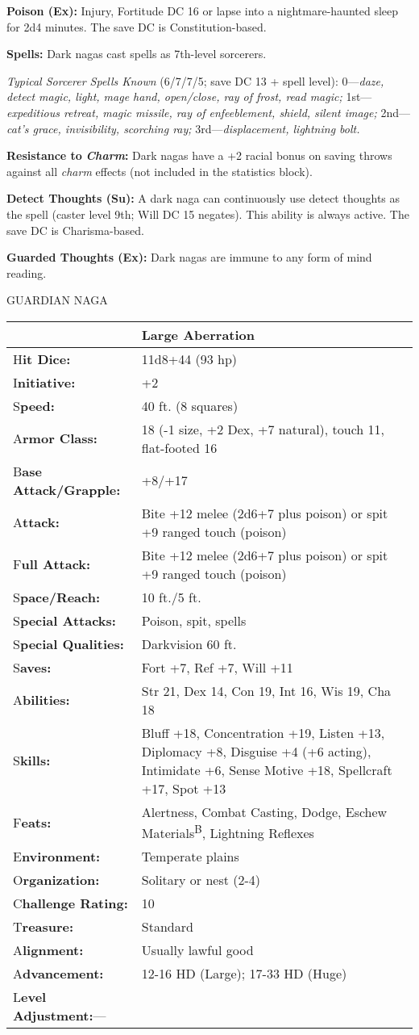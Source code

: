 \documentclass{article}
\begin{document}
\textbf{Poison (Ex):} Injury, Fortitude DC 16 or lapse into a nightmare-haunted 
sleep for 2d4 minutes. The save DC is Constitution-based.

\textbf{Spells:} Dark nagas cast spells as 7th-level sorcerers.

\textit{Typical Sorcerer Spells Known }(6/7/7/5; save DC 13 + spell level): 0---\textit{daze, 
detect magic, light, mage hand, open/close, ray of frost, read magic; }1st---\textit{expeditious 
retreat, magic missile, ray of enfeeblement, shield, silent image; }2nd---\textit{cat's 
grace, invisibility, scorching ray; }3rd---\textit{displacement, lightning bolt.}

\textbf{Resistance to }\textit{\textbf{Charm}}\textbf{: }Dark nagas have a +2 racial 
bonus on saving throws against all \textit{charm }effects (not included in the 
statistics block).

\textbf{Detect Thoughts (Su):} A dark naga can continuously use detect thoughts 
as the spell (caster level 9th; Will DC 15 negates). This ability is always active. 
The save DC is Charisma-based.

\textbf{Guarded Thoughts (Ex):} Dark nagas are immune to any form of mind reading.

\vspace{12pt}
GUARDIAN NAGA

\begin{tabular}{|>{\raggedright}p{82pt}|>{\raggedright}p{244pt}|}
\hline
  & Large Aberration\tabularnewline
\hline
H\textbf{it Dice:} & 11d8+44 (93 hp)\tabularnewline
\hline
I\textbf{nitiative:} & +2\tabularnewline
\hline
S\textbf{peed:} & 40 ft. (8 squares)\tabularnewline
\hline
A\textbf{rmor Class:} & 18 (-1 size, +2 Dex, +7 natural), touch 11, flat-footed 
16\tabularnewline
\hline
B\textbf{ase Attack/Grapple:} & +8/+17\tabularnewline
\hline
A\textbf{ttack:} & Bite +12 melee (2d6+7 plus poison) or spit +9 ranged touch (poison)\tabularnewline
\hline
F\textbf{ull Attack:} & Bite +12 melee (2d6+7 plus poison) or spit +9 ranged touch 
(poison)\tabularnewline
\hline
S\textbf{pace/Reach:} & 10 ft./5 ft.\tabularnewline
\hline
S\textbf{pecial Attacks:} & Poison, spit, spells\tabularnewline
\hline
S\textbf{pecial Qualities:} & Darkvision 60 ft.\tabularnewline
\hline
S\textbf{aves:} & Fort +7, Ref +7, Will +11\tabularnewline
\hline
A\textbf{bilities:} & Str 21, Dex 14, Con 19, Int 16, Wis 19, Cha 18\tabularnewline
\hline
S\textbf{kills:} & Bluff +18, Concentration +19, Listen +13, Diplomacy +8, Disguise 
+4 (+6 acting), Intimidate +6, Sense Motive +18, Spellcraft +17, Spot +13\tabularnewline
\hline
F\textbf{eats:} & Alertness, Combat Casting, Dodge, Eschew Materials\textsuperscript{B}, 
Lightning Reflexes\tabularnewline
\hline
E\textbf{nvironment:} & Temperate plains\tabularnewline
\hline
O\textbf{rganization:} & Solitary or nest (2-4)\tabularnewline
\hline
C\textbf{hallenge Rating:} & 10\tabularnewline
\hline
T\textbf{reasure:} & Standard\tabularnewline
\hline
A\textbf{lignment:} & Usually lawful good\tabularnewline
\hline
A\textbf{dvancement:} & 12-16 HD (Large); 17-33 HD (Huge)\tabularnewline
\hline
L\textbf{evel Adjustment:}--- & \tabularnewline
\hline
\end{tabular}
\end{document}
